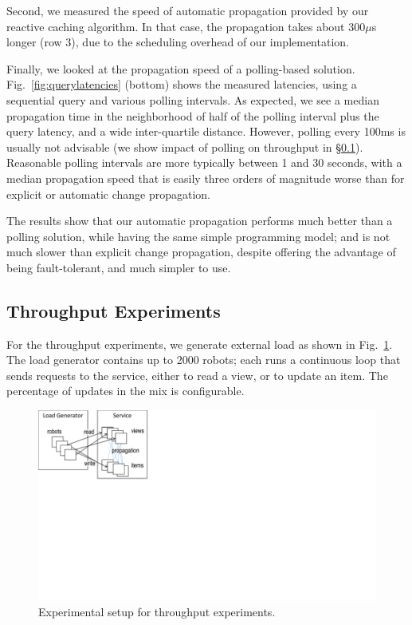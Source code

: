 Second, we measured the speed of automatic propagation provided by our reactive caching algorithm. In that case, the propagation takes about 300$\mu$s longer (row 3), due to the scheduling overhead of our implementation.

Finally, we looked at the propagation speed of a polling-based solution. Fig.~\ref{fig:querylatencies} (bottom) shows the measured latencies, using a sequential query and various polling intervals. As expected, we see a median propagation time in the neighborhood of half of the polling interval plus the query latency, and a wide inter-quartile distance. However, polling every 100ms is usually not advisable (we show impact of polling on throughput in \S\ref{sec:throughput}). Reasonable polling intervals are more typically between 1 and 30 seconds, with a median propagation speed that is easily three orders of magnitude worse than for explicit or automatic change propagation.  

 The results show that our automatic propagation performs much better than a polling solution, while having the same simple programming model; and is not much slower than explicit change propagation, despite offering the advantage of being fault-tolerant, and much simpler to use.


\subsection{Throughput Experiments}\label{sec:throughput}

For the throughput experiments, we generate external load as shown in Fig.~\ref{fig:tp-setup}. The load generator contains up to 2000 robots; each runs a continuous loop that sends requests to the service, either to read a view, or to update an item. The percentage of updates in the mix is configurable. 

\begin{figure}
\centering
\includegraphics[scale=.5, viewport=0 346 309 540]{figs/tp-setup} 
\caption{Experimental setup for throughput experiments.}\label{fig:tp-setup}
\end{figure}

